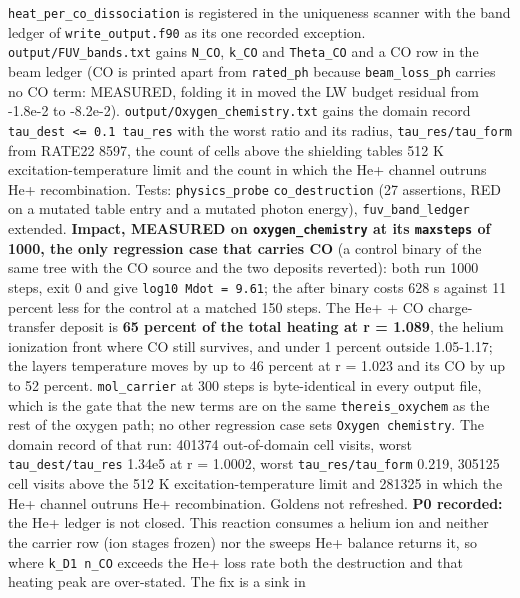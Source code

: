 \documentclass[english,a4paper]{my_memo}
\begin{document}
\begin{itemize}
  \texttt{heat\_per\_co\_dissociation} is registered in the uniqueness scanner with
  the band ledger of \texttt{write\_output.f90} as its one recorded exception.
  \texttt{output/FUV\_bands.txt} gains \texttt{N\_CO}, \texttt{k\_CO} and \texttt{Theta\_CO} and a CO row in
  the beam ledger (CO is printed apart from \texttt{rated\_ph} because
  \texttt{beam\_loss\_ph} carries no CO term: MEASURED, folding it in moved the LW
  budget residual from -1.8e-2 to -8.2e-2). \texttt{output/Oxygen\_chemistry.txt}
  gains the domain record \texttt{tau\_dest\ \textless{}=\ 0.1\ tau\_res} with the worst ratio and
  its radius, \texttt{tau\_res/tau\_form} from RATE22 8597, the count of cells above
  the shielding table\textquotesingle s 512 K excitation-temperature limit and the count in
  which the He+ channel outruns He+ recombination. Tests: \texttt{physics\_probe}
  \texttt{co\_destruction} (27 assertions, RED on a mutated table entry and a
  mutated photon energy), \texttt{fuv\_band\_ledger} extended.
  \textbf{Impact, MEASURED on \texttt{oxygen\_chemistry} at its \texttt{maxsteps} of 1000, the
  only regression case that carries CO} (a control binary of the same tree
  with the CO source and the two deposits reverted): both run 1000 steps,
  exit 0 and give \texttt{log10\ Mdot\ =\ 9.61}; the after binary costs 628 s against
  11 percent less for the control at a matched 150 steps. The He+ + CO
  charge-transfer deposit is \textbf{65 percent of the total heating at
  r = 1.089}, the helium ionization front where CO still survives, and
  under 1 percent outside 1.05-1.17; the layer\textquotesingle s temperature moves by up to
  46 percent at r = 1.023 and its CO by up to 52 percent. \texttt{mol\_carrier} at
  300 steps is byte-identical in every output file, which is the gate that
  the new terms are on the same \texttt{thereis\_oxychem} as the rest of the oxygen
  path; no other regression case sets \texttt{Oxygen\ chemistry}. The domain record
  of that run: 401374 out-of-domain cell visits, worst \texttt{tau\_dest/tau\_res}
  1.34e5 at r = 1.0002, worst \texttt{tau\_res/tau\_form} 0.219, 305125 cell visits
  above the 512 K excitation-temperature limit and 281325 in which the He+
  channel outruns He+ recombination. Goldens not refreshed.
  \textbf{P0 recorded:} the He+ ledger is not closed. This reaction consumes a
  helium ion and neither the carrier row (ion stages frozen) nor the sweep\textquotesingle s
  He+ balance returns it, so where \texttt{k\_D1\ n\_CO} exceeds the He+ loss rate both
  the destruction and that heating peak are over-stated. The fix is a sink in

\end{itemize}
\end{document}
